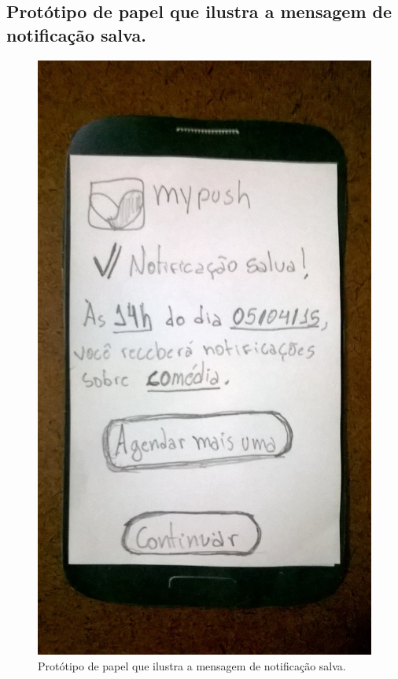 \begin{anexosenv}
    \pagebreak
    \section*{Protótipo de papel que ilustra a mensagem de notificação salva.}
    
      \begin{figure}[!htbp]
	\centering
	\includegraphics[scale=0.32, angle=-90]{editaveis/figuras/prototipo_papel_v1/notificacao_salva}
	\caption{Protótipo de papel que ilustra a mensagem de notificação salva.}
	\label{notificacao_salva_v1}
      \end{figure}
    

\end{anexosenv}
